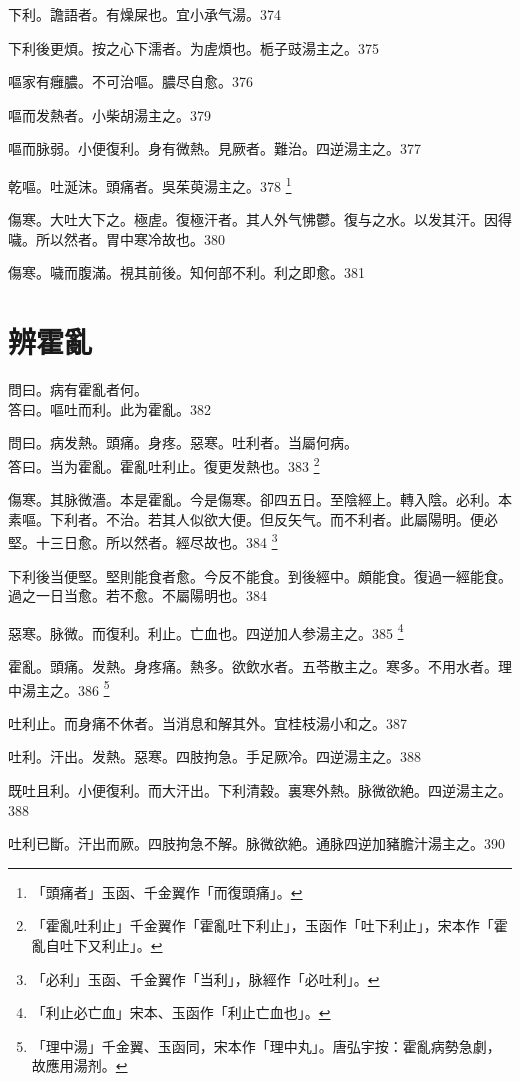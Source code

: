\documentclass[b5paper,twoside,zihao=-4,UTF8]{ctexbook}
\begin{document}
下利。譫語者。有燥屎也。宜{小}承气湯。374

下利後更煩。按之心下濡者。为虗煩也。栀子{豉}湯主之。375

嘔家有癰膿。不可治嘔。膿尽自愈。376

嘔而发熱者。小柴胡湯主之。379

嘔而脉弱。小便復利。身有微熱。見厥者。難治。四逆湯主之。377

乾嘔。吐涎沫。頭痛者。吳茱萸湯主之。378
	\footnote{「頭痛者」玉函、千金翼作「而復頭痛」。}

傷寒。大吐大下之。極虗。復極汗者。其人外气怫鬱。復与之水。以发其汗。因得噦。所以然者。胃中寒冷故也。380

傷寒。噦而腹滿。視其前後。知何部不利。利之即愈。381

\chapter{辨霍亂}

問曰。病有霍亂者何。\\
答曰。嘔吐而利。此为霍亂。382

問曰。病发熱。頭痛。身疼。惡寒。吐利者。当屬何病。\\
答曰。当为霍亂。霍亂吐利止。復更发熱也。383
	\footnote{「霍亂吐利止」千金翼作「霍亂吐下利止」，玉函作「吐下利止」，宋本作「霍亂自吐下又利止」。}

傷寒。其脉微濇。本是霍亂。今是傷寒。卻四五日。至陰經上。轉入陰。必利。本素嘔。下利者。不治。若其人似欲大便。但反矢气。而不利者。此屬陽明。便必堅。十三日愈。所以然者。經尽故也。384
	\footnote{「必利」玉函、千金翼作「当利」，脉經作「必吐利」。}

下利後当便堅。堅則能食者愈。今反不能食。到後經中。頗能食。復過一經能食。過之一日当愈。若不愈。不屬陽明也。384

惡寒。脉微。而復利。利止。亡血也。四逆加人参湯主之。385
	\footnote{「利止必亡血」宋本、玉函作「利止亡血也」。}

霍亂。頭痛。发熱。身疼痛。熱多。欲飲水者。五苓散主之。寒多。不用水者。理中湯主之。386
	\footnote{「理中湯」千金翼、玉函同，宋本作「理中丸」。唐弘宇按：霍亂病勢急劇，故應用湯剂。}

吐利止。而身痛不休者。当消息和解其外。宜桂枝湯小和之。387

吐利。汗出。发熱。惡寒。四肢拘急。手足厥冷。四逆湯主之。388

既吐且利。小便復利。而大汗出。下利清穀。裏寒外熱。脉微欲絶。四逆湯主之。388

吐利已斷。汗出而厥。四肢拘急不解。脉微欲絶。通脉四逆加豬膽汁湯主之。390
\end{document}
